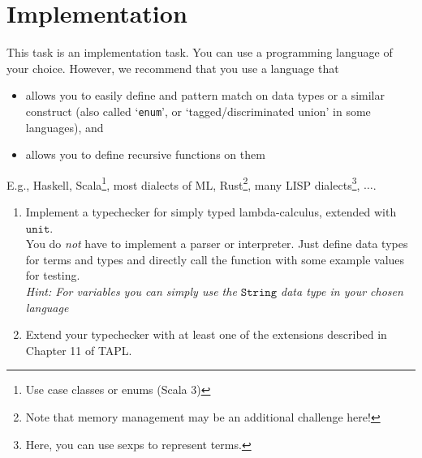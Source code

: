 \section{Implementation}
This task is an implementation task. 
You can use a programming language of your choice.
However, we recommend that you use a language that 
\begin{itemize}
  \item allows you to easily define and
    pattern match on data types or a similar construct (also called `\verb|enum|', or `tagged/discriminated union' in some languages), and
  \item allows you to define recursive functions on them
\end{itemize}
E.g.,
Haskell,
Scala\footnote{Use case classes or enums (Scala 3)},
most dialects of ML, 
Rust\footnote{Note that memory management may be an additional challenge here!},
many LISP dialects\footnote{Here, you can use sexps to represent terms.},
$\dots$.

\begin{enumerate}
  \item Implement a typechecker for simply typed lambda-calculus, extended with $\mathtt{unit}$.\\
    You do \emph{not} have to implement a parser or interpreter. Just define data types for terms and types and directly call the function
    with some example values for testing.\\
    \emph{Hint: For variables you can simply use the $\mathtt{String}$ data type in your chosen language}
  \item Extend your typechecker with at least one of the extensions described in Chapter 11 of TAPL.
\end{enumerate}

